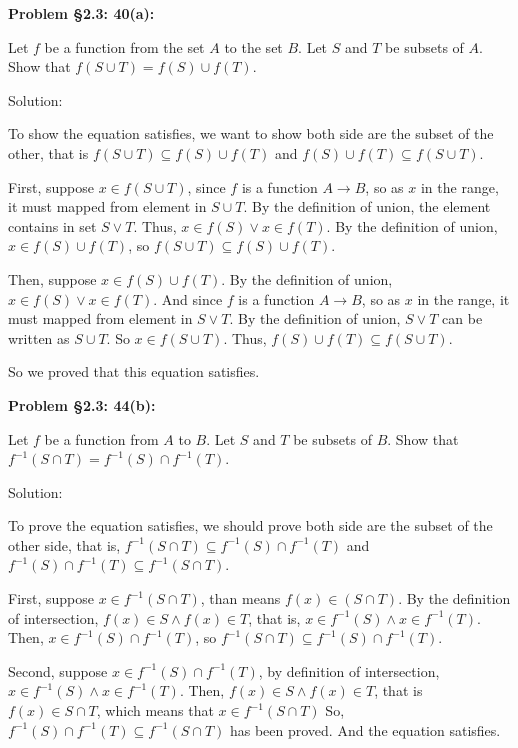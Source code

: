\documentclass{article}
\newenvironment{problem}[1]
{\begin{mdframed}[default]
\textbf{Problem #1:}
}
{\end{mdframed}
}
\begin{document}
\begin{problem}{\S 2.3: 40(a)}
Let $f$ be a function from the set $A$ to the set $B$. Let $S$ and $T$ be subsets
of $A$. Show that $f(S \cup T) = f(S) \cup f(T)$.

Solution:

To show the equation satisfies, we want to show both side are the subset of the other, that is $f(S\cup T)\subseteq f(S)\cup f(T)$ and $f(S)\cup f(T)\subseteq f(S\cup T)$.

First, suppose $x\in f(S\cup T)$, since $f$ is a function $A\rightarrow B$, so as $x$ in the range, it must mapped from element in $S \cup T$. By the definition of union, the element contains in set $S \lor T$. Thus, $x\in f(S) \lor x\in f(T)$. By the definition of union, $x\in f(S)\cup f(T)$, so $f(S\cup T)\subseteq f(S)\cup f(T)$.

Then, suppose $x \in f(S) \cup f(T)$. By the definition of union, $x\in f(S) \lor x\in f(T)$. And since $f$ is a function $A\rightarrow B$, so as $x$ in the range, it must mapped from element in $S \lor T$. By the definition of union, $S \lor T$ can be written as $S \cup T$. So $x \in f(S \cup T)$. Thus, $f(S)\cup f(T)\subseteq f(S\cup T)$.

So we proved that this equation satisfies.

\end{problem}
\begin{problem}{\S 2.3: 44(b)}
Let $f$ be a function from $A$ to $B$. Let $S$ and $T$ be subsets of $B$. Show that
$f^{-1}(S \cap T) = f^{-1}(S) \cap f^{-1}(T)$.

Solution:

To prove the equation satisfies, we should prove both side are the subset of the other side, that is, $f^{-1}(S\cap T)\subseteq f^{-1}(S)\cap f^{-1}(T)$ 
and $f^{-1}(S)\cap f^{-1}(T)\subseteq f^{-1}(S\cap T)$.

First, suppose $x \in f^{-1}(S\cap T)$, than means $f(x)\in (S\cap T)$.
By the definition of intersection, $f(x)\in S \land f(x)\in T$, that is, $x\in f^{-1}(S) \land x\in f^{-1}(T)$.
Then, $x \in f^{-1}(S)\cap f^{-1}(T)$, so $f^{-1}(S\cap T)\subseteq f^{-1}(S)\cap f^{-1}(T)$.

Second, suppose $x \in f^{-1}(S)\cap f^{-1}(T)$, by definition of intersection, $x\in f^{-1}(S) \land x\in f^{-1}(T)$.
Then, $f(x)\in S \land f(x)\in T$, that is $f(x)\in S\cap T$, which means that $x \in f^{-1}(S\cap T)$
So, $f^{-1}(S)\cap f^{-1}(T)\subseteq f^{-1}(S\cap T)$ has been proved. And the equation satisfies.
\end{problem}
\end{document}
